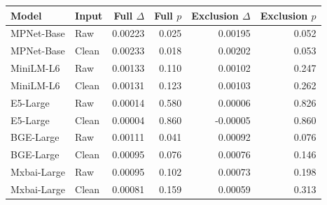 \documentclass[11pt,a4paper]{article}
\begin{document}
\begingroup\small\begin{tabularx}{\textwidth}{@{}Xlrrrr@{}}\toprule
Model & Input & Full $\Delta$ & Full $p$ & Exclusion $\Delta$ & Exclusion $p$ \\
\midrule
MPNet-Base & Raw & 0.00223 & 0.025 & 0.00195 & 0.052 \\
MPNet-Base & Clean & 0.00233 & 0.018 & 0.00202 & 0.053 \\
MiniLM-L6 & Raw & 0.00133 & 0.110 & 0.00102 & 0.247 \\
MiniLM-L6 & Clean & 0.00131 & 0.123 & 0.00103 & 0.262 \\
E5-Large & Raw & 0.00014 & 0.580 & 0.00006 & 0.826 \\
E5-Large & Clean & 0.00004 & 0.860 & -0.00005 & 0.860 \\
BGE-Large & Raw & 0.00111 & 0.041 & 0.00092 & 0.076 \\
BGE-Large & Clean & 0.00095 & 0.076 & 0.00076 & 0.146 \\
Mxbai-Large & Raw & 0.00095 & 0.102 & 0.00073 & 0.198 \\
Mxbai-Large & Clean & 0.00081 & 0.159 & 0.00059 & 0.313 \\
\bottomrule\end{tabularx}
\par{}
\endgroup
\end{document}
